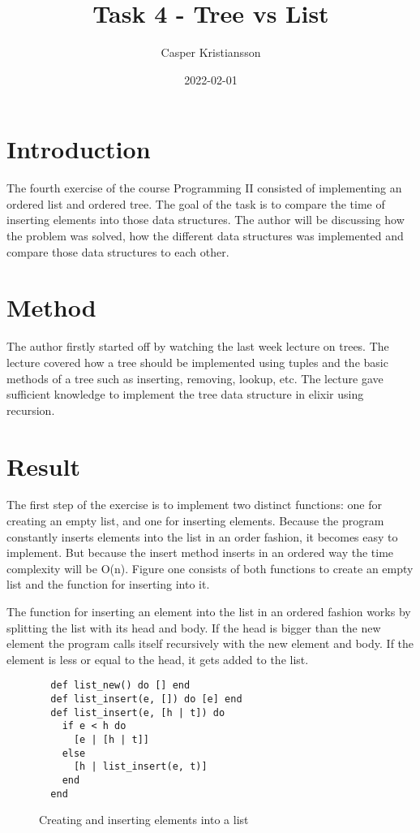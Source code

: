 \documentclass[a4paper,11pt]{article}
\begin{document}
\title{
    \textbf{Task 4 - Tree vs List}
}
\author{Casper Kristiansson}
\date{2022-02-01}

\maketitle

\section*{Introduction}
The fourth exercise of the course Programming II consisted of implementing an ordered list and ordered tree. The goal of the task is to compare the time of inserting elements into those data structures. The author will be discussing how the problem was solved, how the different data structures was implemented and compare those data structures to each other.

\section*{Method}
The author firstly started off by watching the last week lecture on trees. The lecture covered how a tree should be implemented using tuples and the basic methods of a tree such as inserting, removing, lookup, etc. The lecture gave sufficient knowledge to implement the tree data structure in elixir using recursion.

\section*{Result}
The first step of the exercise is to implement two distinct functions: one for creating an empty list, and one for inserting elements. Because the program constantly inserts elements into the list in an order fashion, it becomes easy to implement. But because the insert method inserts in an ordered way the time complexity will be O(n). Figure one consists of both functions to create an empty list and the function for inserting into it.

The function for inserting an element into the list in an ordered fashion works by splitting the list with its head and body. If the head is bigger than the new element the program calls itself recursively with the new element and body. If the element is less or equal to the head, it gets added to the list.


\begin{figure}[H]
\begin{verbatim}
  def list_new() do [] end
  def list_insert(e, []) do [e] end
  def list_insert(e, [h | t]) do
    if e < h do
      [e | [h | t]]
    else
      [h | list_insert(e, t)]
    end
  end
\end{verbatim}
\caption{Creating and inserting elements into a list}
\label{Figure:1}
\end{figure}
\end{document}
